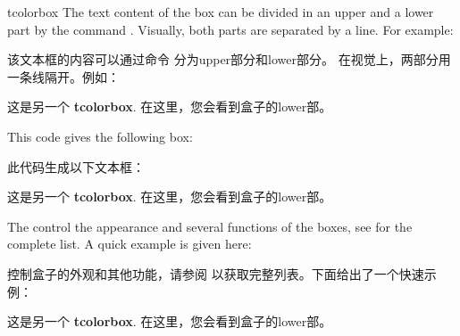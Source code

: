 \begin{docEnvironment}{tcolorbox}{}
The text content of the box can be divided
in an upper and a lower part
by the command . Visually, both parts are separated by a line.
For example:

该文本框的内容可以通过命令  分为upper部分和lower部分。 在视觉上，两部分用一条线隔开。例如：

\begin{dispListing}
\begin{tcolorbox}
这是另一个 \textbf{tcolorbox}.
\tcblower
在这里，您会看到盒子的lower部。
\end{tcolorbox}
\end{dispListing}

This code gives the following box:

此代码生成以下文本框：

\begin{tcolorbox}
这是另一个 \textbf{tcolorbox}.
\tcblower
在这里，您会看到盒子的lower部。
\end{tcolorbox}

The  control the appearance and several functions of the boxes,
see  for the complete list.
A quick example is given here:

{}控制盒子的外观和其他功能，请参阅  以获取完整列表。下面给出了一个快速示例：

\begin{dispExample}
\begin{tcolorbox}[colback=red!5!white,colframe=red!75!black,title=My nice heading]
  这是另一个 \textbf{tcolorbox}.
\tcblower
在这里，您会看到盒子的lower部。
\end{tcolorbox}
\end{dispExample}
\end{docEnvironment}